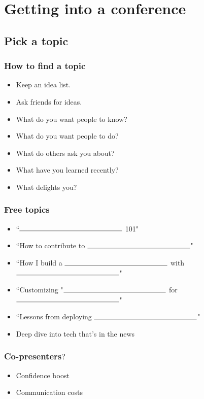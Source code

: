 \documentclass{beamer}
\begin{document}
\section{Getting into a conference}

\begin{frame}[fragile]
\tableofcontents[currentsection]
\end{frame}

\subsection{Pick a topic}

\begin{frame}[fragile]
\frametitle{How to find a topic}
\begin{itemize}[<+(1)->]
\item Keep an idea list.
\item Ask friends for ideas.
\item What do you want people to know?
\item What do you want people to do?
\item What do others ask you about?
\item What have you learned recently?
\item What delights you?
\end{itemize}
\end{frame}

\begin{frame}[fragile]
\frametitle{Free topics}
\begin{itemize}[<+(1)->]
\item ``$\rule{2in}{0.15mm}$ 101"
\item ``How to contribute to $\rule{2in}{0.15mm}$"
\item ``How I build a $\rule{2in}{0.15mm}$ with $\rule{2in}{0.15mm}$"
\item ``Customizing "$\rule{2in}{0.15mm}$ for $\rule{2in}{0.15mm}$"
\item ``Lessons from deploying $\rule{2in}{0.15mm}$"
\item Deep dive into tech that's in the news
\end{itemize}
\end{frame}

\begin{frame}[fragile]
\frametitle{Co-presenters$?$}
\begin{itemize}[<+(1)->]
\item Confidence boost
\item Communication costs
\end{itemize}
\end{frame}
\end{document}
